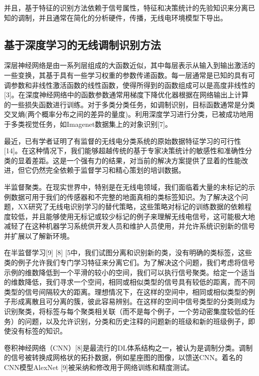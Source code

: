 并且，基于特征的识别方法依赖于信号属性，特征和决策统计的先验知识来分离已知的调制，并且通常在简化的分析硬件，传播，无线电环境模型下导出。\par

\subsection{基于深度学习的无线调制识别方法}
深层神经网络是由一系列层组成的大函数近似，其中每层表示从输入到输出激活的一些变换，其基于具有一些学习权重的参数传递函数。每一层通常是已知的具有可调参数和非线性激活函数的线性函数，使得所得到的函数组成可以是高度非线性的[3]。在深度神经网络中的函数参数通常用梯度下降优化器根据在网络输出上计算的一些损失函数进行训练。对于多类分类任务，如调制识别，目标函数通常是分类交叉熵(两个概率分布之间的差异的量度)。利用深度学习进行分类，已被成功地用于多类视觉任务，如Imagenet数据集上的对象识别[7]。\par

最近，已有学者证明了有监督的无线电分类系统的原始数据特征学习的可行性[14]。在这种情况下，我们能够超越传统的基于专家决策统计的敏感性和准确性分类的显着差距。这是一个强有力的结果，对当前的解决方案提供了显着的性能改进，但它仍然完全依赖于监督学习和精心策划的培训数据。

半监督聚类。在现实世界中，特别是在无线电领域，我们面临着大量的未标记的示例数据可用于我们的传感器和不完整的地面真相的类标签知识。为了解决这个问题，XX研究了无线电识别学习的替代策略，这些策略对标记的训练数据的依赖程度较低，并且能够使用无标记或较少标记的例子来理解无线电信号，这可能极大地减轻了在这种机器学习系统供开发人员和维护人员使用，并允许系统识别新的信号并扩展以了解新环境。\par

在半监督学习[9] [8] [5中，我们试图分离和识别新的类，没有明确的类标签，这些类的例子允许我们专门学习特征来分离它们。为了解决这个问题，我们考虑将信号示例的维数降低到一个平滑的较小的空间，我们可以执行信号聚类。给定一个适当的维数降低，我们寻求一个空间，相同或相似类型的信号具有较低的距离，而不同类型的信号间隔较大的距离。理想情况下，在这样的空间中，相同或相似类型的例子形成离散且可分离的簇，彼此容易辨别。在这样的空间中信号类型的分类则成为识别聚类，将标签与每个聚类相关联（而不是每个例子，一个劳动密集度较低的任务）的问题，以及允许识别，分类和历史注释的问题新的班级和新的班级例子，即使没有标签的知识。\par

卷积神经网络（CNN）[8]是最流行的DL体系结构之一，被认为是调制分类。调制的信号被转换成网格状的拓扑数据，例如星座图的图像，以馈送CNN。着名的CNN模型AlexNet [9]被采纳和修改用于网络训练和精度测试。 \par


